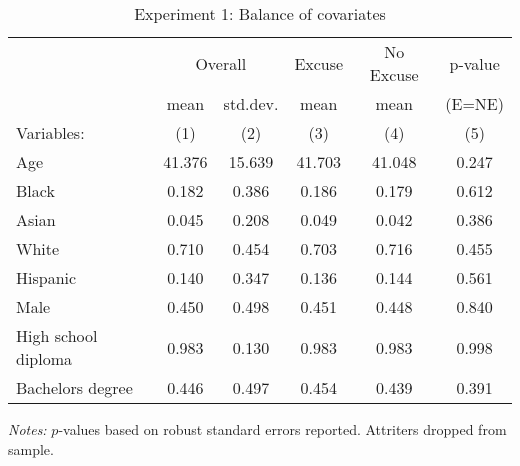\begin{table}[!ht]
\centering
\caption{Experiment 1: Balance of covariates}
\label{t:1-balance}
\vspace*{2mm}
\begin{threeparttable}
\begin{tabular}{lccccc}
\toprule
 & \multicolumn{2}{c}{Overall} & Excuse & No Excuse & p-value \\
 \cmidrule(r){2-3} \cmidrule(lr){4-4} \cmidrule(lr){5-5} \cmidrule(lr){6-6} 
 & mean & std.dev. & mean & mean & (E=NE) \\
 \cmidrule(r){2-2} \cmidrule(lr){3-3} \cmidrule(lr){4-4} \cmidrule(lr){5-5} \cmidrule(l){6-6} 
  Variables: & (1) & (2) & (3) & (4) & (5) \\ \midrule \midrule
Age & 41.376 & 15.639 & 41.703 & 41.048 & 0.247 \\
\addlinespace
Black & 0.182 & 0.386 & 0.186 & 0.179 & 0.612 \\
Asian & 0.045 & 0.208 & 0.049 & 0.042 & 0.386 \\
White & 0.710 & 0.454 & 0.703 & 0.716 & 0.455 \\
Hispanic & 0.140 & 0.347 & 0.136 & 0.144 & 0.561 \\
\addlinespace
Male & 0.450 & 0.498 & 0.451 & 0.448 & 0.840 \\
\addlinespace
High school diploma & 0.983 & 0.130 & 0.983 & 0.983 & 0.998 \\
Bachelors degree & 0.446 & 0.497 & 0.454 & 0.439 & 0.391 \\
 \midrule
\bottomrule
\end{tabular}
\begin{tablenotes}[flushleft] \footnotesize
\item \textit{Notes: }$p$-values based on robust standard errors reported. Attriters dropped from sample.
\end{tablenotes} \end{threeparttable} \end{table}
